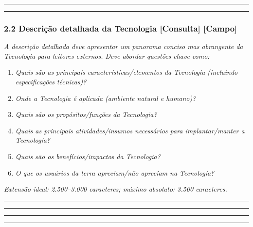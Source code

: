 \begin{center}\rule{0.5\linewidth}{0.5pt}\end{center}

\begin{center}\rule{0.5\linewidth}{0.5pt}\end{center}

\subsubsection{2.2 Descrição detalhada da Tecnologia {[Consulta]} {[Campo]}}\label{descriuxe7uxe3o-detalhada-da-tecnologia}

\emph{A descrição detalhada deve apresentar um panorama conciso mas abrangente da Tecnologia para leitores externos. Deve abordar questões-chave como:}

\begin{enumerate}
\def\labelenumi{\arabic{enumi}.}
\tightlist
\item
  \emph{Quais são as principais características/elementos da Tecnologia (incluindo especificações técnicas)?}
\item
  \emph{Onde a Tecnologia é aplicada (ambiente natural e humano)?}
\item
  \emph{Quais são os propósitos/funções da Tecnologia?}
\item
  \emph{Quais as principais atividades/insumos necessários para implantar/manter a Tecnologia?}
\item
  \emph{Quais são os benefícios/impactos da Tecnologia?}
\item
  \emph{O que os usuários da terra apreciam/não apreciam na Tecnologia?}
\end{enumerate}

\emph{Extensão ideal: 2.500--3.000 caracteres; máximo absoluto: 3.500 caracteres.}

\begin{center}\rule{0.5\linewidth}{0.5pt}\end{center}

\begin{center}\rule{0.5\linewidth}{0.5pt}\end{center}

\begin{center}\rule{0.5\linewidth}{0.5pt}\end{center}

\begin{center}\rule{0.5\linewidth}{0.5pt}\end{center}


